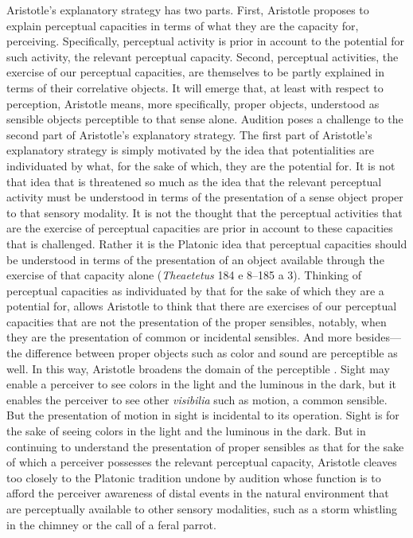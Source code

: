 Aristotle's explanatory strategy has two parts. First, Aristotle proposes to explain perceptual capacities in terms of what they are the capacity for, perceiving. Specifically, perceptual activity is prior in account to the potential for such activity, the relevant perceptual capacity. Second, perceptual activities, the exercise of our perceptual capacities, are themselves to be partly explained in terms of their correlative objects. It will emerge that, at least with respect to perception, Aristotle means, more specifically, proper objects, understood as sensible objects perceptible to that sense alone. Audition poses a challenge to the second part of Aristotle's explanatory strategy. The first part of Aristotle's explanatory strategy is simply motivated by the idea that potentialities are individuated by what, for the sake of which, they are the potential for. It is not that idea that is threatened so much as the idea that the relevant perceptual activity must be understood in terms of the presentation of a sense object proper to that sensory modality. It is not the thought that the perceptual activities that are the exercise of perceptual capacities are prior in account to these capacities that is challenged. Rather it is the Platonic idea that perceptual capacities should be understood in terms of the presentation of an object available through the exercise of that capacity alone (\emph{Theaetetus} 184 e 8--185 a 3). Thinking of perceptual capacities as individuated by that for the sake of which they are a potential for, allows Aristotle to think that there are exercises of our perceptual capacities that are not the presentation of the proper sensibles, notably, when they are the presentation of common or incidental sensibles. And more besides---the difference between proper objects such as color and sound are perceptible as well. In this way, Aristotle broadens the domain of the perceptible \citep{Sorabji:1971fr,Sorabji:2003fk,Kalderon:2015fr}. Sight may enable a perceiver to see colors in the light and the luminous in the dark, but it enables the perceiver to see other \emph{visibilia} such as motion, a common sensible. But the presentation of motion in sight is incidental to its operation. Sight is for the sake of seeing colors in the light and the luminous in the dark. But in continuing to understand the presentation of proper sensibles as that for the sake of which a perceiver possesses the relevant perceptual capacity, Aristotle cleaves too closely to the Platonic tradition undone by audition whose function is to afford the perceiver awareness of distal events in the natural environment that are perceptually available to other sensory modalities, such as a storm whistling in the chimney or the call of a feral parrot.

